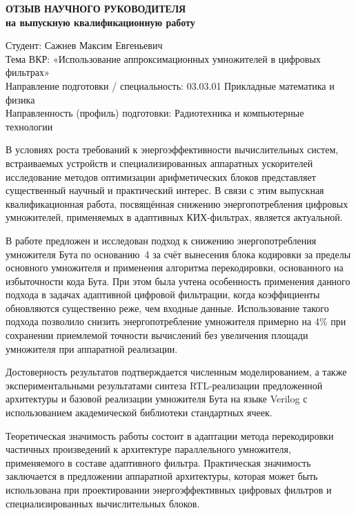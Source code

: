 \documentclass[12pt]{article}
\begin{document}
\begin{center}
  {\large\bfseries ОТЗЫВ НАУЧНОГО РУКОВОДИТЕЛЯ}\\[2pt]
  {\large\bfseries на выпускную квалификационную работу}
\end{center}

\medskip

\noindent Студент: Сажнев Максим Евгеньевич\\
Тема ВКР: «Использование аппроксимационных умножителей в цифровых
фильтрах»\\
Направление подготовки / специальность: 03.03.01 Прикладные математика и
физика\\
Направленность (профиль) подготовки: Радиотехника и компьютерные технологии

\medskip

В условиях роста требований к энергоэффективности вычислительных систем,
встраиваемых устройств и специализированных аппаратных ускорителей
исследование методов оптимизации арифметических блоков представляет
существенный научный и практический интерес. В связи с этим выпускная
квалификационная работа, посвящённая снижению энергопотребления цифровых
умножителей, применяемых в адаптивных КИХ-фильтрах, является актуальной.

В работе предложен и исследован подход к снижению энергопотребления
умножителя Бута по основанию~4 за счёт вынесения блока кодировки за пределы
основного умножителя и применения алгоритма перекодировки, основанного на
избыточности кода Бута. При этом была учтена особенность применения данного
подхода в задачах адаптивной цифровой фильтрации, когда коэффициенты
обновляются существенно реже, чем входные данные. Использование такого
подхода позволило снизить энергопотребление умножителя примерно на 4\% при
сохранении приемлемой точности вычислений без увеличения площади умножителя
при аппаратной реализации.

Достоверность результатов подтверждается численным моделированием, а также
экспериментальными результатами синтеза RTL-реализации предложенной
архитектуры и базовой реализации умножителя Бута на языке Verilog с
использованием академической библиотеки стандартных ячеек.

Теоретическая значимость работы состоит в адаптации метода перекодировки
частичных произведений к архитектуре параллельного умножителя, применяемого
в составе адаптивного фильтра. Практическая значимость заключается в
предложении аппаратной архитектуры, которая может быть использована при
проектировании энергоэффективных цифровых фильтров и специализированных
вычислительных блоков.
\end{document}
